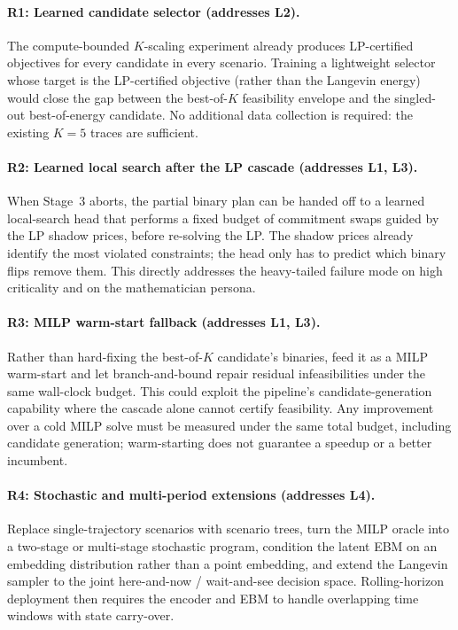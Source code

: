 \documentclass{article}
\begin{document}
\paragraph{R1: Learned candidate selector (addresses L2).}
The compute-bounded $K$-scaling experiment already produces LP-certified objectives for every candidate in every scenario. Training a lightweight selector whose target is the LP-certified objective (rather than the Langevin energy) would close the gap between the best-of-$K$ feasibility envelope and the singled-out best-of-energy candidate. No additional data collection is required: the existing $K=5$ traces are sufficient.

\paragraph{R2: Learned local search after the LP cascade (addresses L1, L3).}
When Stage~3 aborts, the partial binary plan can be handed off to a learned local-search head that performs a fixed budget of commitment swaps guided by the LP shadow prices, before re-solving the LP. The shadow prices already identify the most violated constraints; the head only has to predict which binary flips remove them. This directly addresses the heavy-tailed failure mode on high criticality and on the mathematician persona.

\paragraph{R3: MILP warm-start fallback (addresses L1, L3).}
Rather than hard-fixing the best-of-$K$ candidate's binaries, feed it as a MILP warm-start and let branch-and-bound repair residual infeasibilities under the same wall-clock budget. This could exploit the pipeline's candidate-generation capability where the cascade alone cannot certify feasibility. Any improvement over a cold MILP solve must be measured under the same total budget, including candidate generation; warm-starting does not guarantee a speedup or a better incumbent.

\paragraph{R4: Stochastic and multi-period extensions (addresses L4).}
Replace single-trajectory scenarios with scenario trees, turn the MILP oracle into a two-stage or multi-stage stochastic program, condition the latent EBM on an embedding distribution rather than a point embedding, and extend the Langevin sampler to the joint here-and-now / wait-and-see decision space. Rolling-horizon deployment then requires the encoder and EBM to handle overlapping time windows with state carry-over.
\end{document}
